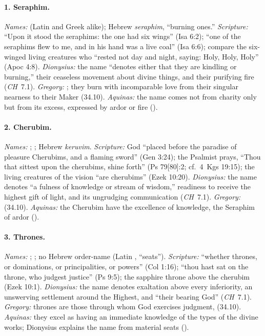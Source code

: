 \paragraph{1. Seraphim.} \emph{Names:}  (Latin and Greek alike);
Hebrew \emph{seraphim}, ``burning ones.'' \emph{Scripture:} ``Upon it
stood the seraphims: the one had six wings'' (Isa 6:2); ``one of the
seraphims flew to me, and in his hand was a live coal'' (Isa 6:6);
compare the six-winged living creatures who ``rested not day and night,
saying: Holy, Holy, Holy'' (Apoc 4:8). \emph{Dionysius:} the name
``denotes either that they are kindling or burning,'' their ceaseless
movement about divine things, and their purifying fire (\emph{CH}~7.1).
\emph{Gregory:} ; they burn with incomparable love from their singular
nearness to their Maker (34.10). \emph{Aquinas:} the name comes not
from charity only but from its excess, expressed by ardor or fire
().

\paragraph{2. Cherubim.} \emph{Names:} ;
; Hebrew \emph{keruvim}. \emph{Scripture:} God ``placed
before the paradise of pleasure Cherubims, and a flaming sword'' (Gen
3:24); the Psalmist prays, ``Thou that sittest upon the cherubims, shine
forth'' (Ps 79[80]:2; cf.\ 4~Kgs 19:15); the
living creatures of the vision ``are cherubims'' (Ezek 10:20).
\emph{Dionysius:} the name denotes ``a fulness of knowledge or stream
of wisdom,'' readiness to receive the highest gift of light, and its
ungrudging communication (\emph{CH}~7.1). \emph{Gregory:}
 (34.10).
\emph{Aquinas:} the Cherubim have the excellence of knowledge, the
Seraphim of ardor ().

\paragraph{3. Thrones.} \emph{Names:} ; ;
no Hebrew order-name (Latin , ``seats''). \emph{Scripture:}
``whether thrones, or dominations, or principalities, or powers'' (Col
1:16); ``thou hast sat on the throne, who judgest justice'' (Ps 9:5);
the sapphire throne above the cherubim (Ezek 10:1). \emph{Dionysius:}
the name denotes exaltation above every inferiority, an unswerving
settlement around the Highest, and ``their bearing God'' (\emph{CH}~7.1). \emph{Gregory:} thrones are those through whom God exercises
judgment,  (34.10). \emph{Aquinas:} they excel as having an immediate
knowledge of the types of the divine works; Dionysius explains the name
from material seats ().


